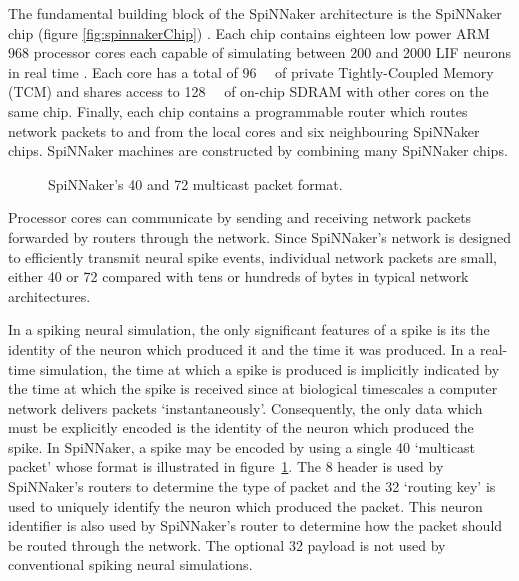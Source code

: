 		The fundamental building block of the SpiNNaker architecture is the
		SpiNNaker chip (figure \ref{fig:spinnakerChip}) \cite{furber13}. Each chip
		contains eighteen low power ARM 968 processor cores each capable of
		simulating between \num{200} and \num{2000} LIF neurons in real time
		\cite{mundy15}.  Each core has a total of \SI{96}{\kilo\byte} of private
		Tightly-Coupled Memory (TCM) and shares access to \SI{128}{\mega\byte} of
		on-chip SDRAM with other cores on the same chip. Finally, each chip
		contains a programmable router which routes network packets to and from the
		local cores and six neighbouring SpiNNaker chips. SpiNNaker machines are
		constructed by combining many SpiNNaker chips.
		
		\begin{figure}
			\center
			
			\caption{SpiNNaker's \SI{40}{\bit} and \SI{72}{\bit} multicast packet
			format.}
			\label{fig:spinnaker-packet}
		\end{figure}
		
		Processor cores can communicate by sending and receiving network packets
		forwarded by routers through the network. Since SpiNNaker's network is
		designed to efficiently transmit neural spike events, individual network
		packets are small, either \SI{40}{\bit} or \SI{72}{\bit} compared with tens
		or hundreds of bytes in typical network architectures.
		
		In a spiking neural simulation, the only significant features of a spike is
		its the identity of the neuron which produced it and the time it was
		produced. In a real-time simulation, the time at which a spike is produced
		is implicitly indicated by the time at which the spike is received since at
		biological timescales a computer network delivers packets
		`instantaneously'. Consequently, the only data which must be explicitly
		encoded is the identity of the neuron which produced the spike. In
		SpiNNaker, a spike may be encoded by using a single \SI{40}{\bit}
		`multicast packet' whose format is illustrated in
		figure~\ref{fig:spinnaker-packet}.  The \SI{8}{\bit} header is used by
		SpiNNaker's routers to determine the type of packet and the \SI{32}{\bit}
		`routing key' is used to uniquely identify the neuron which produced the
		packet. This neuron identifier is also used by SpiNNaker's router to
		determine how the packet should be routed through the network. The optional
		\SI{32}{\bit} payload is not used by conventional spiking neural
		simulations.
	
